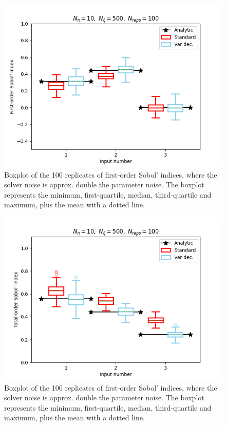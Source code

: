 \begin{figure}
    \centering
    \includegraphics{figures/large_c/si_eta10_xi500.png}
    \caption{Boxplot of the 100 replicates of first-order Sobol’ indices, where the solver noise is approx. double the parameter noise. The boxplot represents the minimum, first-quartile, median, third-quartile and maximum, plus the mean with a dotted line.}
    \label{fig:largec-eta10-si}
\end{figure}
\begin{figure}
    \centering
    \includegraphics{figures/large_c/ti_eta10_xi500.png}
    \caption{Boxplot of the 100 replicates of first-order Sobol’ indices, where the solver noise is approx. double the parameter noise. The boxplot represents the minimum, first-quartile, median, third-quartile and maximum, plus the mean with a dotted line.}
    \label{fig:largec-eta10-ti}
\end{figure}


